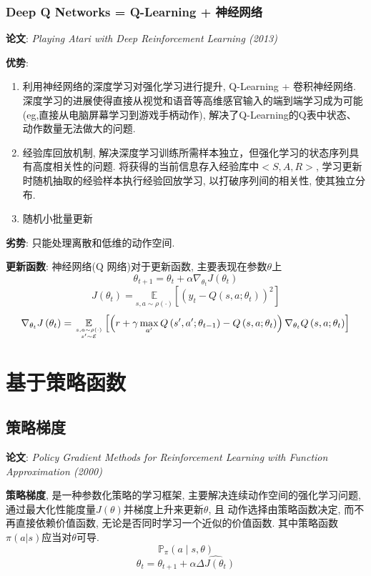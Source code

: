 \documentclass{article}
\newcommand{\env}[2]{\begin{#1}#2\end{#1}}
\begin{document}
    	\subsubsection{Deep Q Networks = Q-Learning + 神经网络}
            \textbf{论文}: \textit{Playing Atari with Deep Reinforcement Learning (2013)}
        
            \textbf{优势}:
            \env{enumerate}{
                \item 利用神经网络的深度学习对强化学习进行提升, Q-Learning + 卷积神经网络. 深度学习的进展使得直接从视觉和语音等高维感官输入的端到端学习成为可能 (eg,直接从电脑屏幕学习到游戏手柄动作), 解决了Q-Learning的Q表中状态、动作数量无法做大的问题.
                \item 经验库回放机制, 解决深度学习训练所需样本独立，但强化学习的状态序列具有高度相关性的问题. 将获得的当前信息存入经验库中$<S, A, R>$, 学习更新时随机抽取的经验样本执行经验回放学习, 以打破序列间的相关性, 使其独立分布.
                \item 随机小批量更新
            }

            \textbf{劣势}: 只能处理离散和低维的动作空间.
        
            \textbf{更新函数}: 神经网络(Q 网络)对于更新函数, 主要表现在参数$\theta$上
                $$\theta_{t+1} = \theta_{t} + \alpha \nabla_{\theta_{t}} J\left(\theta_{t}\right)$$
                $$J\left(\theta_{t}\right)=\underset{s, a \sim \rho(\cdot)}{\mathbb{E}} \left[\left(y_{t}-Q\left(s, a ; \theta_{t}\right)\right)^{2}\right]$$
                $$\nabla_{\theta_{t}} J\left(\theta_{t}\right)=\underset{s, a \sim \rho(\cdot) \atop s^{\prime} \sim \mathcal{E}}{\mathbb{E}}\left[\left(r+\gamma \max _{a^{\prime}} Q\left(s^{\prime}, a^{\prime} ; \theta_{t-1}\right)-Q\left(s, a ; \theta_{t}\right)\right) \nabla_{\theta_{t}} Q\left(s, a ; \theta_{t}\right)\right]$$


\section{基于策略函数}

    \subsection{策略梯度}
        \textbf{论文}: \textit{Policy Gradient Methods for Reinforcement Learning with Function Approximation (2000)}

        \textbf{策略梯度}, 是一种参数化策略的学习框架, 主要解决连续动作空间的强化学习问题,  通过最大化性能度量$J(\theta)$并梯度上升来更新$\theta$, 且 动作选择由策略函数决定, 而不再直接依赖价值函数, 无论是否同时学习一个近似的价值函数. 其中策略函数$\pi(a|s)$应当对$\theta$可导.
            $$\mathbb{P}_\pi (a \mid s, \theta)$$
            $$ \theta_t = \theta_{t+1} + \alpha  \widehat{\Delta J(\theta_t)}$$
        
\end{document}
